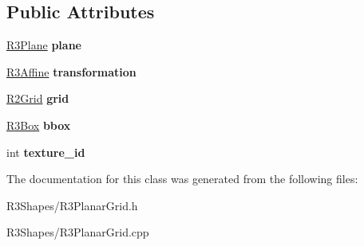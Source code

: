 \subsection*{Public Attributes}
\begin{DoxyCompactItemize}
\item 
\hyperlink{class_r3_plane}{R3\+Plane} {\bfseries plane}\hypertarget{class_r3_planar_grid_a32bde3154edefe572f7b8ab4228b1cb6}{}\label{class_r3_planar_grid_a32bde3154edefe572f7b8ab4228b1cb6}

\item 
\hyperlink{class_r3_affine}{R3\+Affine} {\bfseries transformation}\hypertarget{class_r3_planar_grid_acff82c3683e79b4ecafe66ba1fd1b2fc}{}\label{class_r3_planar_grid_acff82c3683e79b4ecafe66ba1fd1b2fc}

\item 
\hyperlink{class_r2_grid}{R2\+Grid} {\bfseries grid}\hypertarget{class_r3_planar_grid_a1208d99570cdb1ed785e00e3980b6bfa}{}\label{class_r3_planar_grid_a1208d99570cdb1ed785e00e3980b6bfa}

\item 
\hyperlink{class_r3_box}{R3\+Box} {\bfseries bbox}\hypertarget{class_r3_planar_grid_a8dacc6271b44286c13cb775d4196140b}{}\label{class_r3_planar_grid_a8dacc6271b44286c13cb775d4196140b}

\item 
int {\bfseries texture\+\_\+id}\hypertarget{class_r3_planar_grid_a1401b2f06dc1ea9c37ec5fc5dcbf5a44}{}\label{class_r3_planar_grid_a1401b2f06dc1ea9c37ec5fc5dcbf5a44}

\end{DoxyCompactItemize}


The documentation for this class was generated from the following files\+:\begin{DoxyCompactItemize}
\item 
R3\+Shapes/R3\+Planar\+Grid.\+h\item 
R3\+Shapes/R3\+Planar\+Grid.\+cpp\end{DoxyCompactItemize}
